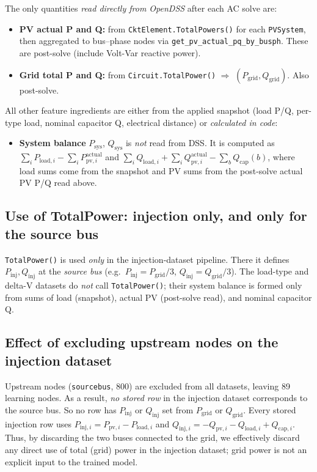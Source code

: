 \documentclass[11pt]{article}
\begin{document}
The only quantities \emph{read directly from OpenDSS} after each AC solve are:
\begin{itemize}[noitemsep]
\item \textbf{PV actual P and Q:} from \texttt{CktElement.TotalPowers()} for each \texttt{PVSystem}, then aggregated to bus--phase nodes via \texttt{get\_pv\_actual\_pq\_by\_busph}. These are post-solve (include Volt-Var reactive power).
\item \textbf{Grid total P and Q:} from \texttt{Circuit.TotalPower()} $\Rightarrow$ $(P_{\mathrm{grid}},Q_{\mathrm{grid}})$. Also post-solve.
\end{itemize}
All other feature ingredients are either from the applied snapshot (load P/Q, per-type load, nominal capacitor Q, electrical distance) or \emph{calculated in code}:
\begin{itemize}[noitemsep]
\item \textbf{System balance} $P_{\mathrm{sys}}$, $Q_{\mathrm{sys}}$ is \emph{not} read from DSS. It is computed as
  $\sum_i P_{\mathrm{load},i}-\sum_i P_{\mathrm{pv},i}^{\mathrm{actual}}$ and
  $\sum_i Q_{\mathrm{load},i}+\sum_i Q_{\mathrm{pv},i}^{\mathrm{actual}}-\sum_b Q_{\mathrm{cap}}(b)$,
  where load sums come from the snapshot and PV sums from the post-solve actual PV P/Q read above.
\end{itemize}

\subsection*{Use of TotalPower: injection only, and only for the source bus}

\texttt{TotalPower()} is used \emph{only} in the injection-dataset pipeline. There it defines $P_{\mathrm{inj}},Q_{\mathrm{inj}}$ at the \emph{source bus} (e.g.\ $P_{\mathrm{inj}}=P_{\mathrm{grid}}/3$, $Q_{\mathrm{inj}}=Q_{\mathrm{grid}}/3$). The load-type and delta-V datasets do \emph{not} call \texttt{TotalPower()}; their system balance is formed only from sums of load (snapshot), actual PV (post-solve read), and nominal capacitor Q.

\subsection*{Effect of excluding upstream nodes on the injection dataset}

Upstream nodes (\texttt{sourcebus}, 800) are excluded from all datasets, leaving 89 learning nodes. As a result, \emph{no stored row} in the injection dataset corresponds to the source bus. So no row has $P_{\mathrm{inj}}$ or $Q_{\mathrm{inj}}$ set from $P_{\mathrm{grid}}$ or $Q_{\mathrm{grid}}$. Every stored injection row uses $P_{\mathrm{inj},i}=P_{\mathrm{pv},i}-P_{\mathrm{load},i}$ and $Q_{\mathrm{inj},i}=-Q_{\mathrm{pv},i}-Q_{\mathrm{load},i}+Q_{\mathrm{cap},i}$. Thus, by discarding the two buses connected to the grid, we effectively discard any direct use of total (grid) power in the injection dataset; grid power is not an explicit input to the trained model.
\end{document}
